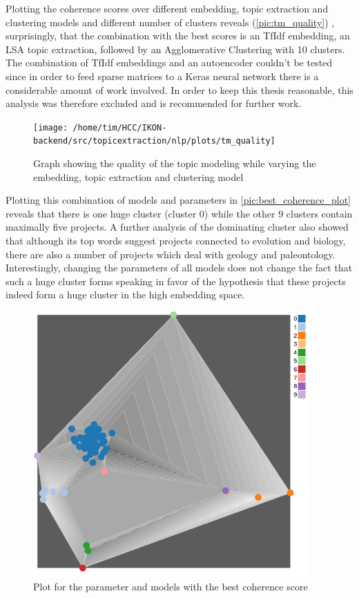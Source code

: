 Plotting the coherence scores over different embedding, topic extraction and clustering models and different number of clusters reveals (\autoref{pic:tm_quality}) , surprisingly, that the combination with the best scores is an TfIdf embedding, an LSA topic extraction, followed by an Agglomerative Clustering with 10 clusters. The combination of TfIdf embeddings and an autoencoder couldn't be tested since in order to feed sparse matrices to a Keras neural network there is a considerable amount of work involved. In order to keep this thesis reasonable, this analysis was therefore excluded and is recommended for further work.

\begin{figure}[htbp!]
	\centering
	\texttt{[image: /home/tim/HCC/IKON-backend/src/topicextraction/nlp/plots/tm\_quality]}
	\caption{\label{pic:tm_quality} Graph showing the quality of the topic modeling while varying the embedding, topic extraction and clustering model}
\end{figure}

Plotting this combination of models and parameters in \autoref{pic:best_coherence_plot} reveals that there is one huge cluster (cluster 0) while the other 9 clusters contain maximally five projects. A further analysis of the dominating cluster also showed that although its top words suggest projects connected to evolution and biology, there are also a number of projects which deal with geology and paleontology. Interestingly, changing the parameters of all models does not change the fact that such a huge cluster forms speaking in favor of the hypothesis that these projects indeed form a huge cluster in the high embedding space.

\begin{figure}[htbp!]
	\centering
	\includegraphics[width=400px]{../chapters/validation/pics/best_coherence}
	\caption{\label{pic:best_coherence_plot} Plot for the parameter and models with the best coherence score}
\end{figure}

